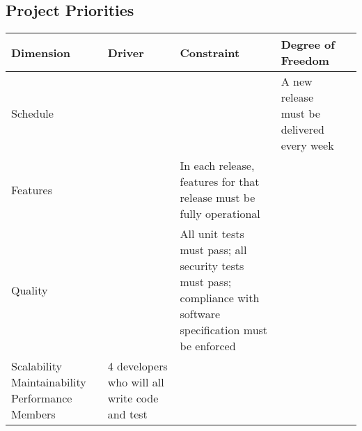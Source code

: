 \documentclass[letter]{scrartcl}
\begin{document}
\subsection{Project Priorities}
\begin{tabular}{| l | l | l | l | l |}
\hline
\textbf{Dimension} & \textbf{Driver} & \textbf{Constraint} & \textbf{Degree of Freedom} \\
\hline
\hline
Schedule & & & A new release must be delivered every week \\
\hline
Features & & In each release, features for that release must be fully operational & \\
\hline
Quality  & & All unit tests must pass; all security tests must pass; compliance with software specification must be enforced & \\
\hline
Scalability
\hline
Maintainability
\hline
Performance
\hline
Members  & 4 developers who will all write code and test & & \\
\end{tabular}
\end{document}
